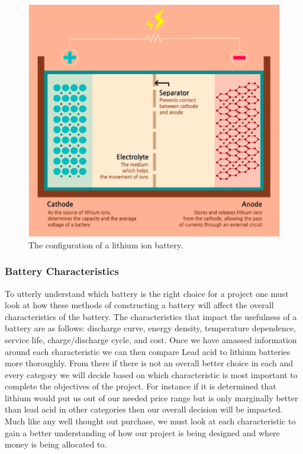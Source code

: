 \begin{figure}
    \centering
    \includegraphics[scale=0.4]{figures/lithium ion battery.png}
    \caption{The configuration of a lithium ion battery.}
    \label{lithium-ion-battery} 
\end{figure}

\subsubsection{Battery Characteristics}
To utterly understand which battery is the right choice for a project one must look at how these methods of constructing a battery will affect the overall characteristics of the battery. The characteristics that impact the usefulness of a battery are as follows: discharge curve, energy density, temperature dependence, service life, charge/discharge cycle, and cost. Once we have amassed information around each characteristic we can then compare Lead acid to lithium batteries more thoroughly. From there if there is not an overall better choice in each and every category we will decide based on which characteristic is most important to complete the objectives of the project. For instance if it is determined that lithium would put us out of our needed price range but is only marginally better than lead acid in other categories then our overall decision will be impacted. Much like any well thought out purchase, we must look at each characteristic to gain a better understanding of how our project is being designed and where money is being allocated to.

